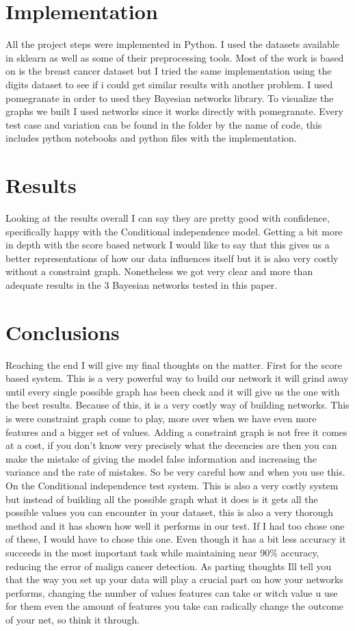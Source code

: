 \documentclass{article} %
\begin{document}
\section{Implementation}
 All the project steps were implemented in Python. I used the datasets available in sklearn as well as some of their preprocessing tools. Most of the work is based on is the breast cancer dataset but I tried the same implementation using the digits dataset to see if i could get similar results with another problem. I used pomegranate in order to used they Bayesian networks library. To visualize the graphs we built I used networks since it works directly with pomegranate. Every test case and variation can be found in the folder by the name of code, this includes python notebooks and python files with the implementation.
\section{Results}
Looking at the results overall I can say they are pretty good with confidence, specifically happy with the Conditional independence model. Getting a bit more in depth with the score based network I would like to say that this gives us a better representations of how our data influences itself but it is also very costly without a constraint graph. Nonetheless we got very clear and more than adequate results in the 3 Bayesian networks tested in this paper.
\section{Conclusions}
Reaching the end I will give my final thoughts on the matter. First for the score based system. This is a very powerful way to build our network it will grind away until every single possible graph has been check and it will give us the one with the best results. Because of this, it is a very costly way of building networks. This is were constraint graph come to play, more over when we have even more features and a bigger set of values. Adding a constraint graph is not free it comes at a cost, if you don't know very precisely what the decencies are then you can make the mistake of giving the model false information and increasing the variance and the rate of mistakes. So be very careful how and when you use this.
\bigskip
On the Conditional independence test system. This is also a very costly system but instead of building all the possible graph what it does is it gets all the possible values you can encounter in your dataset, this is also a very thorough method and it has shown how well it performs in our test. If I had too chose one of these, I would have to chose this one. Even though it has a bit less accuracy it succeeds in the most important task while maintaining near 90\% accuracy, reducing the error of malign cancer detection.
\bigskip
As parting thoughts Ill tell you that the way you set up your data will play a crucial part on how your networks performs, changing the number of values features can take or witch value u use for them even the amount of features you take can radically change the outcome of your net, so think it through.
\end{document}
